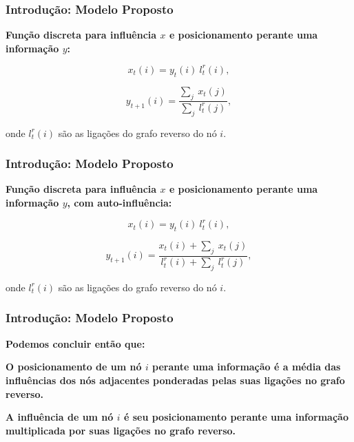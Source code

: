 \begin{frame}
  \frametitle{Introdução: Modelo Proposto}

  \textbf{Função discreta para influência $x$ e posicionamento perante
  uma informação $y$:}

  \begin{alertblock}{}

    \begin{equation}
      x_{t}(i) = y_{t}(i) \  l_{t}^{r}(i),
    \end{equation}

    \begin{equation}
      y_{t+1}(i) = \frac{\sum_{j} \  x_{t}(j)}{\sum_{j} \  l_{t}^{r}(j)},
    \end{equation}

  \end{alertblock}
  \vspace{5mm}

  onde $l_{t}^{r}(i)$ são as ligações do grafo reverso do nó $i$.
\end{frame}

\begin{frame}
  \frametitle{Introdução: Modelo Proposto}

  \textbf{Função discreta para influência $x$ e posicionamento perante
  uma informação $y$, com auto-influência:}

  \begin{alertblock}{}

    \begin{equation}
      x_{t}(i) = y_{t}(i) \  l_{t}^{r}(i),
    \end{equation}

    \begin{equation}
      y_{t+1}(i) = \frac{x_{t}(i) + \sum_{j} \  x_{t}(j)}{l_{t}^{r}(i) + \sum_{j} \  l_{t}^{r}(j)},
    \end{equation}

  \end{alertblock}
  \vspace{5mm}

  onde $l_{t}^{r}(i)$ são as ligações do grafo reverso do nó $i$.
\end{frame}

\begin{frame}
  \frametitle{Introdução: Modelo Proposto}

  \textbf{Podemos concluir então que:}

  \begin{alertblock}{}
    \vspace{5mm}

    \textbf{\alert{O posicionamento de um nó $i$ perante uma informação} é a
      média das influências dos nós adjacentes ponderadas pelas suas ligações
      no grafo reverso.}
    \vspace{5mm}

    \textbf{\alert{A influência de um nó $i$} é seu posicionamento perante uma
      informação multiplicada por suas ligações no grafo reverso.}
    \vspace{5mm}

  \end{alertblock}
\end{frame}

